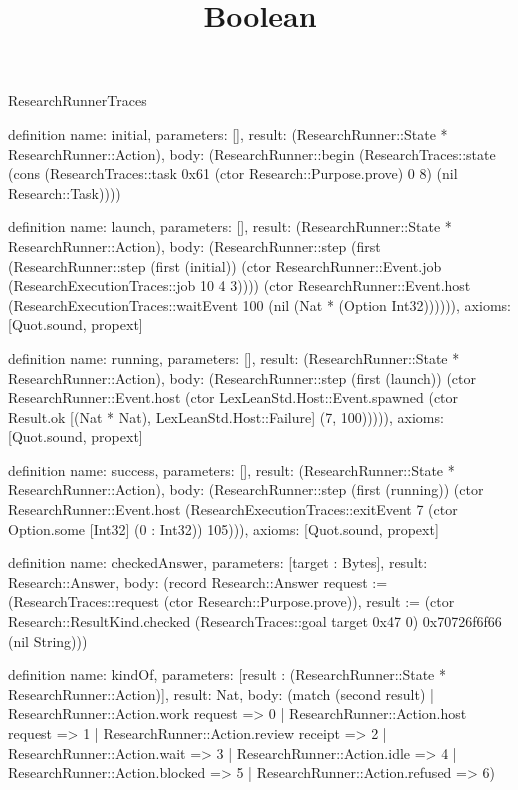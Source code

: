 \begin{lexlean}{ResearchRunnerTraces}
\title{Boolean}
\begin{semanticmodule}

definition{
  name: initial,
  parameters: [],
  result: (ResearchRunner::State * ResearchRunner::Action),
  body: (ResearchRunner::begin (ResearchTraces::state (cons (ResearchTraces::task 0x61 (ctor Research::Purpose.prove) 0 8) (nil Research::Task))))
}

definition{
  name: launch,
  parameters: [],
  result: (ResearchRunner::State * ResearchRunner::Action),
  body: (ResearchRunner::step (first (ResearchRunner::step (first (initial)) (ctor ResearchRunner::Event.job (ResearchExecutionTraces::job 10 4 3)))) (ctor ResearchRunner::Event.host (ResearchExecutionTraces::waitEvent 100 (nil (Nat * (Option Int32)))))),
  axioms: [Quot.sound, propext]
}

definition{
  name: running,
  parameters: [],
  result: (ResearchRunner::State * ResearchRunner::Action),
  body: (ResearchRunner::step (first (launch)) (ctor ResearchRunner::Event.host (ctor LexLeanStd.Host::Event.spawned (ctor Result.ok [(Nat * Nat), LexLeanStd.Host::Failure] (7, 100))))),
  axioms: [Quot.sound, propext]
}

definition{
  name: success,
  parameters: [],
  result: (ResearchRunner::State * ResearchRunner::Action),
  body: (ResearchRunner::step (first (running)) (ctor ResearchRunner::Event.host (ResearchExecutionTraces::exitEvent 7 (ctor Option.some [Int32] (0 : Int32)) 105))),
  axioms: [Quot.sound, propext]
}

definition{
  name: checkedAnswer,
  parameters: [target : Bytes],
  result: Research::Answer,
  body: (record Research::Answer {request := (ResearchTraces::request (ctor Research::Purpose.prove)), result := (ctor Research::ResultKind.checked (ResearchTraces::goal target 0x47 0) 0x70726f6f66 (nil String))})
}

definition{
  name: kindOf,
  parameters: [result : (ResearchRunner::State * ResearchRunner::Action)],
  result: Nat,
  body: (match (second result) | ResearchRunner::Action.work request => 0 | ResearchRunner::Action.host request => 1 | ResearchRunner::Action.review receipt => 2 | ResearchRunner::Action.wait  => 3 | ResearchRunner::Action.idle  => 4 | ResearchRunner::Action.blocked  => 5 | ResearchRunner::Action.refused  => 6)
}


\end{semanticmodule}
\end{lexlean}
